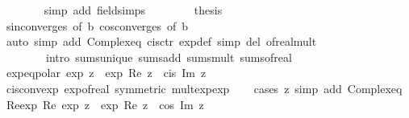 \begin{isabellebody}
\ \ \ \ \ \ \isamarkupfalse%
\ {\isacharparenleft}{\kern0pt}simp\ add{\isacharcolon}{\kern0pt}\ field{\isacharunderscore}{\kern0pt}simps{\isacharparenright}{\kern0pt}\isanewline
\ \ \isamarkupfalse%
\isanewline
\ \ \isamarkupfalse%
\ \isamarkupfalse%
\ {\isacharquery}{\kern0pt}thesis\isanewline
\ \ \ \ \isamarkupfalse%
\ sin{\isacharunderscore}{\kern0pt}converges\ {\isacharbrackleft}{\kern0pt}of\ b{\isacharbrackright}{\kern0pt}\ cos{\isacharunderscore}{\kern0pt}converges\ {\isacharbrackleft}{\kern0pt}of\ b{\isacharbrackright}{\kern0pt}\isanewline
\ \ \ \ \isamarkupfalse%
\ {\isacharparenleft}{\kern0pt}auto\ simp\ add{\isacharcolon}{\kern0pt}\ Complex{\isacharunderscore}{\kern0pt}eq\ cis{\isachardot}{\kern0pt}ctr\ exp{\isacharunderscore}{\kern0pt}def\ simp\ del{\isacharcolon}{\kern0pt}\ of{\isacharunderscore}{\kern0pt}real{\isacharunderscore}{\kern0pt}mult\isanewline
\ \ \ \ \ \ \ \ intro{\isacharbang}{\kern0pt}{\isacharcolon}{\kern0pt}\ sums{\isacharunderscore}{\kern0pt}unique\ sums{\isacharunderscore}{\kern0pt}add\ sums{\isacharunderscore}{\kern0pt}mult\ sums{\isacharunderscore}{\kern0pt}of{\isacharunderscore}{\kern0pt}real{\isacharparenright}{\kern0pt}\isanewline
{}\isamarkupfalse%
%
\endisatagproof
{\isafoldproof}%
%
\isadelimproof
\isanewline
%
\endisadelimproof
\isanewline
{}\isamarkupfalse%
\ exp{\isacharunderscore}{\kern0pt}eq{\isacharunderscore}{\kern0pt}polar{\isacharcolon}{\kern0pt}\ {\isachardoublequoteopen}exp\ z\ {\isacharequal}{\kern0pt}\ exp\ {\isacharparenleft}{\kern0pt}Re\ z{\isacharparenright}{\kern0pt}\ {\isacharasterisk}{\kern0pt}\ cis\ {\isacharparenleft}{\kern0pt}Im\ z{\isacharparenright}{\kern0pt}{\isachardoublequoteclose}\isanewline
%
\isadelimproof
\ \ %
\endisadelimproof
%
\isatagproof
{}\isamarkupfalse%
\ cis{\isacharunderscore}{\kern0pt}conv{\isacharunderscore}{\kern0pt}exp\ exp{\isacharunderscore}{\kern0pt}of{\isacharunderscore}{\kern0pt}real\ {\isacharbrackleft}{\kern0pt}symmetric{\isacharbrackright}{\kern0pt}\ mult{\isacharunderscore}{\kern0pt}exp{\isacharunderscore}{\kern0pt}exp\isanewline
\ \ \isamarkupfalse%
\ {\isacharparenleft}{\kern0pt}cases\ z{\isacharparenright}{\kern0pt}\ {\isacharparenleft}{\kern0pt}simp\ add{\isacharcolon}{\kern0pt}\ Complex{\isacharunderscore}{\kern0pt}eq{\isacharparenright}{\kern0pt}%
\endisatagproof
{\isafoldproof}%
%
\isadelimproof
\isanewline
%
\endisadelimproof
\isanewline
{}\isamarkupfalse%
\ Re{\isacharunderscore}{\kern0pt}exp{\isacharcolon}{\kern0pt}\ {\isachardoublequoteopen}Re\ {\isacharparenleft}{\kern0pt}exp\ z{\isacharparenright}{\kern0pt}\ {\isacharequal}{\kern0pt}\ exp\ {\isacharparenleft}{\kern0pt}Re\ z{\isacharparenright}{\kern0pt}\ {\isacharasterisk}{\kern0pt}\ cos\ {\isacharparenleft}{\kern0pt}Im\ z{\isacharparenright}{\kern0pt}{\isachardoublequoteclose}\isanewline

\end{isabellebody}
